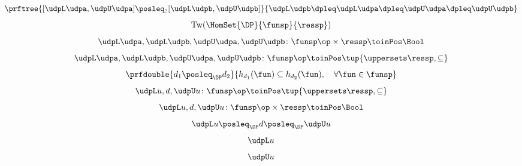 {\begin{forslides}
        \begin{equation*}
            \label{eq:order_udp_1}
            \prftree{[\udpL\udpa,\udpU\udpa] \posleq_{?} [\udpL\udpb,\udpU\udpb]}{\udpL\udpb\dpleq\udpL\udpa\dpleq\udpU\udpa\dpleq\udpU\udpb}
        \end{equation*}
        \begin{equation*}
            \label{eq:order_udp_2}
            \text{Tw}(\HomSet{\DP}{\funsp}{\ressp})
        \end{equation*}
        \begin{equation*}
            \label{eq:order_udp_3}
            \udpL\udpa,\udpL\udpb,\udpU\udpa,\udpU\udpb\colon \funsp\op \times \ressp \toinPos \Bool
        \end{equation*}
        \begin{equation*}
            \label{eq:order_udp_4}
            \udpL\udpa,\udpL\udpb,\udpU\udpa,\udpU\udpb\colon \funsp\op \toinPos  \tup{\uppersets \ressp, \subseteq}
        \end{equation*}
        \begin{equation*}
            \label{eq:upos_dp_def_4}
            \prfdouble{d_1\posleq_\DP d_2}{h_{d_1}(\fun)\subseteq h_{d_2}(\fun), \quad \forall \fun \in \funsp}
        \end{equation*}
        \begin{equation*}
            \label{eq:order_udp_5}
            \udpL u,d,\udpU u\colon \funsp\op \toinPos  \tup{\uppersets \ressp, \subseteq}
        \end{equation*}
        \begin{equation*}
            \label{eq:order_udp_6}
            \udpL u,d,\udpU u\colon  \funsp\op \times \ressp \toinPos \Bool
        \end{equation*}
        \begin{equation*}
            \label{eq:order_udp_7}
            \udpL u \posleq_\DP d \posleq_\DP \udpU u
        \end{equation*}
        \begin{equation*}
            \label{eq:order_udp_8}
            \udpL u
        \end{equation*}
        \begin{equation*}
            \label{eq:order_udp_9}
            \udpU u
        \end{equation*}
        \begin{equation*}
            \label{eq:order_udp_10}
            \begin{aligned}

\end{aligned}
\end{equation*}
\end{forslides}}

